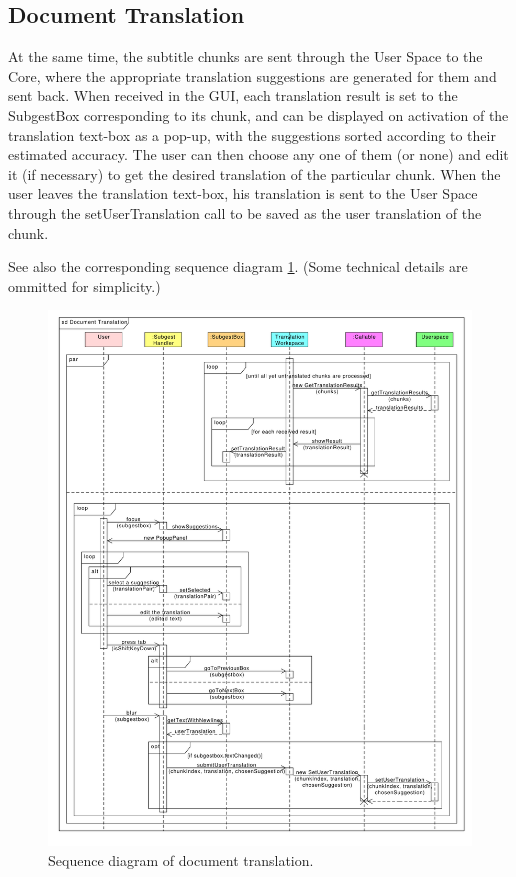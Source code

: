 \subsection{Document Translation}

At the same time, the subtitle chunks are sent through the User Space to the Core, where the appropriate translation suggestions are generated for them and sent back. When received in the GUI, each translation result is set to the SubgestBox corresponding to its chunk, and can be displayed on activation of the translation text-box as a pop-up, with the suggestions sorted according to their estimated accuracy.
The user can then choose any one of them (or none) and edit it (if necessary) to get the desired translation of the particular chunk. When the user leaves the translation text-box, his translation is sent to the User Space through the setUserTranslation call to be saved as the user translation of the chunk.

See also the corresponding sequence diagram \ref{gui:sd:document_translation}.
(Some technical details are ommitted for simplicity.)

\begin{figure}[h]
\begin{center}
\includegraphics[scale=0.45]{figures/document_translation_sequence.pdf}
\end{center}
\caption{Sequence diagram of document translation.}\label{gui:sd:document_translation}
\end{figure}

